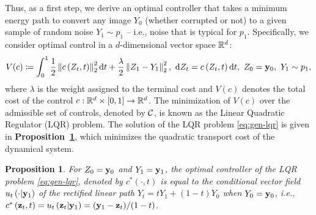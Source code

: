 \documentclass{article} %
\theoremstyle{plain}
\newtheorem{proposition}[theorem]{Proposition}
\newcommand{\deriv}{\mathrm{d}}
\begin{document}
Thus, as a first step, we derive an optimal controller that takes a minimum energy path to convert any image $Y_0$ (whether corrupted or not) to a given sample of random noise $Y_1 \sim p_1$ -- i.e., noise that is typical for $p_1$.
Specifically, we consider optimal control 
in a $d$-dimensional vector space $\mathbb{R}^d$:
\begin{align}
    \label{eq:gen-lqr}
    V(c) \coloneqq  \int_0^1 \frac{1}{2}\left\|c\left(Z_t, t\right)\right\|_2^2 \deriv t + \frac{\lambda}{2} \left\|Z_1 - Y_1\right\|_2^2, ~\deriv Z_t = c\left(Z_t,t\right) \deriv t, ~Z_0 =\rvy_0,~Y_1 \sim p_1,
\end{align}
where $\lambda$ is the weight assigned to the terminal cost and $V(c)$ denotes the total cost of the control $c: \mathbb{R}^d\times [0,1] \rightarrow \mathbb{R}^d$. 
The minimization of $V(c)$ over the admissible set of controls, denoted by ${\mathcal{C}}$, is known as the Linear Quadratic Regulator (LQR) problem.
The solution of the LQR problem \eqref{eq:gen-lqr} is given in \textbf{Proposition~\ref{prop:rf-lqr}}, which minimizes the quadratic transport cost of the dynamical system. 
\begin{proposition}
\label{prop:rf-lqr}
For $Z_0 ={\mathbf{y}}_0$ and $Y_1 = {\mathbf{y}}_1$, the optimal controller of the LQR problem \eqref{eq:gen-lqr}, denoted by $c^*\left(\cdot,t\right)$ is equal to the conditional vector field $u_t\left(\cdot|{\mathbf{y}}_1\right)$ of the rectified linear path $Y_t = tY_1 + (1-t)Y_0$ when $Y_0 = {\mathbf{y}}_0$, i.e., $c^*\left({\mathbf{z}}_t,t\right) = u_t\left({\mathbf{z}}_t|{\mathbf{y}}_1\right) = ({\mathbf{y}}_1 - {\mathbf{z}}_t)/(1-t)$.
\end{proposition}

\end{document}
